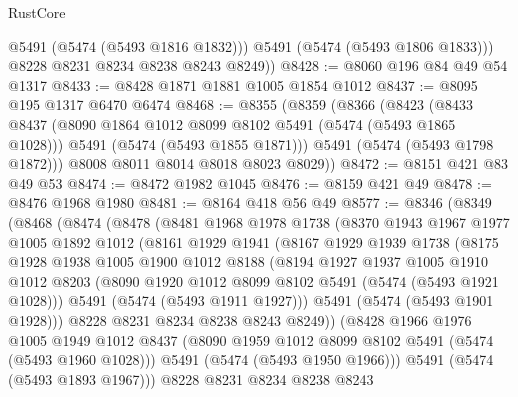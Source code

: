 \begin{lexlean}{RustCore}
\begin{coremodule}
            @5491
            (@5474 (@5493 @1816 @1832)))
          @5491
          (@5474 (@5493 @1806 @1833)))
        @8228
        @8231
        @8234
        @8238
        @8243
        @8249))
@8428 := @8060 @196 @84 @49 @54 @1317
@8433 := @8428 @1871 @1881 @1005 @1854 @1012
@8437 := @8095 @195 @1317 @6470 @6474
@8468 := @8355
    (@8359
      (@8366
        (@8423
          (@8433
            @8437
            (@8090 @1864 @1012 @8099 @8102 @5491 (@5474 (@5493 @1865 @1028)))
            @5491
            (@5474 (@5493 @1855 @1871)))
          @5491
          (@5474 (@5493 @1798 @1872)))
        @8008
        @8011
        @8014
        @8018
        @8023
        @8029))
@8472 := @8151 @421 @83 @49 @53
@8474 := @8472 @1982 @1045
@8476 := @8159 @421 @49
@8478 := @8476 @1968 @1980
@8481 := @8164 @418 @56 @49
@8577 := @8346
    (@8349
      (@8468
        (@8474
          (@8478
            (@8481
              @1968
              @1978
              @1738
              (@8370
                @1943
                @1967
                @1977
                @1005
                @1892
                @1012
                (@8161
                  @1929
                  @1941
                  (@8167
                    @1929
                    @1939
                    @1738
                    (@8175
                      @1928
                      @1938
                      @1005
                      @1900
                      @1012
                      @8188
                      (@8194
                        @1927
                        @1937
                        @1005
                        @1910
                        @1012
                        @8203
                        (@8090 @1920 @1012 @8099 @8102 @5491 (@5474 (@5493 @1921 @1028)))
                        @5491
                        (@5474 (@5493 @1911 @1927)))
                      @5491
                      (@5474 (@5493 @1901 @1928)))
                    @8228
                    @8231
                    @8234
                    @8238
                    @8243
                    @8249))
                (@8428
                  @1966
                  @1976
                  @1005
                  @1949
                  @1012
                  @8437
                  (@8090 @1959 @1012 @8099 @8102 @5491 (@5474 (@5493 @1960 @1028)))
                  @5491
                  (@5474 (@5493 @1950 @1966)))
                @5491
                (@5474 (@5493 @1893 @1967)))
              @8228
              @8231
              @8234
              @8238
              @8243

\end{coremodule}
\end{lexlean}
